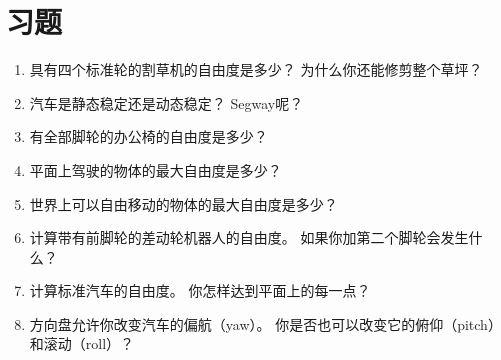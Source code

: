 \section*{习题}\small
\begin{enumerate}
\item 具有四个标准轮的割草机的自由度是多少？ 为什么你还能修剪整个草坪？
\item 汽车是静态稳定还是动态稳定？ Segway呢？
\item 有全部脚轮的办公椅的自由度是多少？
\item 平面上驾驶的物体的最大自由度是多少？
\item 世界上可以自由移动的物体的最大自由度是多少？
\item 计算带有前脚轮的差动轮机器人的自由度。 如果你加第二个脚轮会发生什么？
\item 计算标准汽车的自由度。 你怎样达到平面上的每一点？
\item 方向盘允许你改变汽车的偏航（yaw）。 你是否也可以改变它的俯仰（pitch）和滚动（roll）？
\end{enumerate}\normalsize